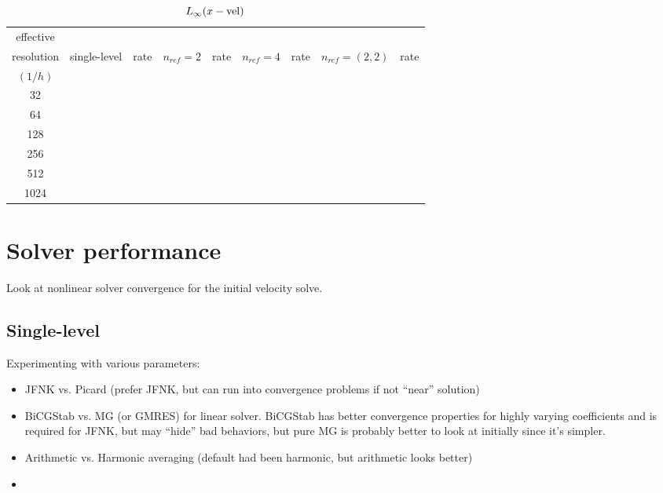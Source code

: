 \documentclass[12pt]{article}
\begin{document}
\begin{table}
\centering
\begin{tabular}{|c|c|c|c|c|c|c|c|c|}
\hline
effective &  &  &  &  &  &  &  &  \\
resolution & single-level & rate & $n_{ref}=2$ & rate & $n_{ref} =
4$ & rate & $n_{ref}=(2,2)$ & rate \\
$(1/h)$ &  &  &  &  &  &  &  &  \\
\hline
32  &  &  &  &  &  &  &  &  \\
64  &  &  &  &  &  &  &  &  \\
128  &  &  &  &  &  &  &  &  \\
256  &  &  &  &  &  &  &  &  \\
512  &  &  &  &  &  &  &  &  \\
1024  &  &  &  &  &  &  &  &  \\
\hline
\end{tabular}
\caption{$L_\infty(x-{\rm vel})$}
\end{table}

\section{Solver performance}
Look at nonlinear solver convergence for the initial velocity solve.

\subsection{Single-level}
Experimenting with various parameters:
\begin{itemize}
\item JFNK vs. Picard (prefer JFNK, but can run into convergence problems if not ``near'' solution)
\item BiCGStab vs. MG (or GMRES) for linear solver. BiCGStab has better convergence properties for highly varying coefficients and is required for JFNK, but may ``hide'' bad behaviors, but pure MG is probably better to look at initially since it's simpler.
\item Arithmetic vs. Harmonic averaging (default had been harmonic, but arithmetic looks better)
\item
\end{itemize}
\end{document}
